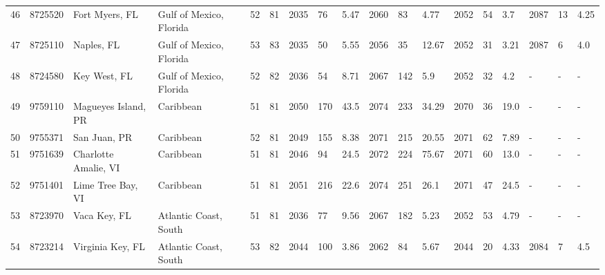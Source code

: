 \begin{longtable}{llllllllllllllllll}
46 &          8725520 &              Fort Myers, FL &  Gulf of Mexico, Florida &              52 &       81 &                      2035 &   76 &   5.47 &     2060 &   83 &   4.77 &                          2052 &  54 &   3.7 &     2087 &   13 &  4.25 \\
47 &          8725110 &                  Naples, FL &  Gulf of Mexico, Florida &              53 &       83 &                      2035 &   50 &   5.55 &     2056 &   35 &  12.67 &                          2052 &  31 &  3.21 &     2087 &    6 &   4.0 \\
48 &          8724580 &                Key West, FL &  Gulf of Mexico, Florida &              52 &       82 &                      2036 &   54 &   8.71 &     2067 &  142 &    5.9 &                          2052 &  32 &   4.2 &        - &    - &     - \\
49 &          9759110 &         Magueyes Island, PR &                Caribbean &              51 &       81 &                      2050 &  170 &   43.5 &     2074 &  233 &  34.29 &                          2070 &  36 &  19.0 &        - &    - &     - \\
50 &          9755371 &                San Juan, PR &                Caribbean &              52 &       81 &                      2049 &  155 &   8.38 &     2071 &  215 &  20.55 &                          2071 &  62 &  7.89 &        - &    - &     - \\
51 &          9751639 &        Charlotte Amalie, VI &                Caribbean &              51 &       81 &                      2046 &   94 &   24.5 &     2072 &  224 &  75.67 &                          2071 &  60 &  13.0 &        - &    - &     - \\
52 &          9751401 &           Lime Tree Bay, VI &                Caribbean &              51 &       81 &                      2051 &  216 &   22.6 &     2074 &  251 &   26.1 &                          2071 &  47 &  24.5 &        - &    - &     - \\
53 &          8723970 &                Vaca Key, FL &    Atlantic Coast, South &              51 &       81 &                      2036 &   77 &   9.56 &     2067 &  182 &   5.23 &                          2052 &  53 &  4.79 &        - &    - &     - \\
54 &          8723214 &            Virginia Key, FL &    Atlantic Coast, South &              53 &       82 &                      2044 &  100 &   3.86 &     2062 &   84 &   5.67 &                          2044 &  20 &  4.33 &     2084 &    7 &   4.5 \\

\end{longtable}
